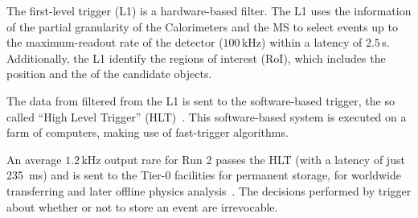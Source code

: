 The first-level trigger (L1) is a hardware-based filter. %
The L1 uses the information of the partial granularity of the Calorimeters and the MS %
to select events up to the maximum-readout rate of the detector ($100\,$kHz) within a latency of $2.5\,$\textmu s. 
Additionally, the L1 identify the regions of interest (RoI), which includes the position and the \pT of the candidate objects.


The data from filtered from the L1 is sent to the software-based trigger, 
the so called ``High Level Trigger'' (HLT)~\cite{ATLAS:2003aa}. %
This software-based system is executed on a farm of computers, %
making use of fast-trigger algorithms. %

An average $1.2\,$kHz output rare for Run 2 passes the HLT (with a latency of just 235~ms) and is sent %
to the Tier-0 facilities for permanent storage, for worldwide transferring and later offline physics analysis~\cite{ATLAS:2016wtr}.  %
The decisions performed by trigger about whether or not to store an event are irrevocable. %




